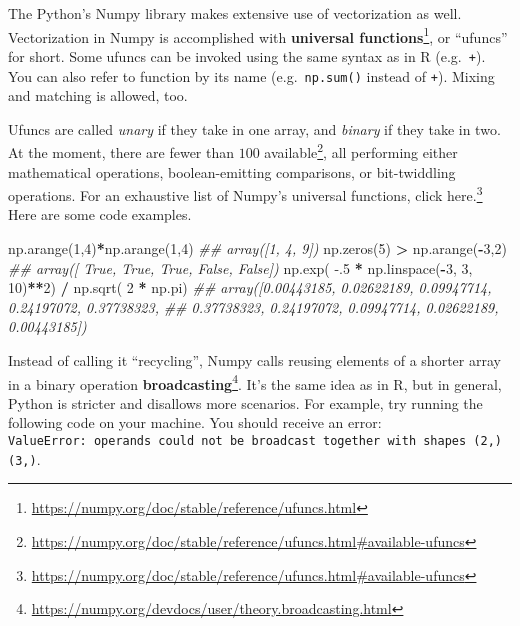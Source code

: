 \documentclass[12pt,krantz2]{krantz}
\makeatletter
\newenvironment{Shaded}{\begin{snugshade}}{\end{snugshade}}
\newcommand{\CommentTok}[1]{\textcolor[rgb]{0.37,0.37,0.37}{\textit{#1}}}
\newcommand{\DecValTok}[1]{\textcolor[rgb]{0.06,0.06,0.06}{#1}}
\newcommand{\FloatTok}[1]{\textcolor[rgb]{0.06,0.06,0.06}{#1}}
\newcommand{\NormalTok}[1]{#1}
\newcommand{\OperatorTok}[1]{\textcolor[rgb]{0.43,0.43,0.43}{\textbf{#1}}}
\renewcommand{\href}[2]{#2\footnote{\url{#1}}}
\newenvironment{kframe}{%
\medskip{}
\setlength{\fboxsep}{.8em}
 \def\at@end@of@kframe{}%
 \ifinner\ifhmode%
  \def\at@end@of@kframe{\end{minipage}}%
  \begin{minipage}{\columnwidth}%
 \fi\fi%
 \def\FrameCommand##1{\hskip\@totalleftmargin \hskip-\fboxsep
 \colorbox{shadecolor}{##1}\hskip-\fboxsep
     \hskip-\linewidth \hskip-\@totalleftmargin \hskip\columnwidth}%
 \MakeFramed {\advance\hsize-\width
   \@totalleftmargin\z@ \linewidth\hsize
   \@setminipage}}%
 {\par\unskip\endMakeFramed%
 \at@end@of@kframe}
\renewenvironment{Shaded}{\begin{kframe}}{\end{kframe}}
\makeatother
\begin{document}
The Python's Numpy library makes extensive use of vectorization as well. Vectorization in Numpy is accomplished with \href{https://numpy.org/doc/stable/reference/ufuncs.html}{\textbf{universal functions}}, or ``ufuncs'' for short. Some ufuncs can be invoked using the same syntax as in R (e.g.~\texttt{+}). You can also refer to function by its name (e.g.~\texttt{np.sum()} instead of \texttt{+}). Mixing and matching is allowed, too.

Ufuncs are called \emph{unary} if they take in one array, and \emph{binary} if they take in two. At the moment, there are \href{https://numpy.org/doc/stable/reference/ufuncs.html\#available-ufuncs}{fewer than \(100\) available}, all performing either mathematical operations, boolean-emitting comparisons, or bit-twiddling operations. For an exhaustive list of Numpy's universal functions, \href{https://numpy.org/doc/stable/reference/ufuncs.html\#available-ufuncs}{click here.} Here are some code examples.

\begin{Shaded}
\begin{Highlighting}[]
\NormalTok{np.arange(}\DecValTok{1}\NormalTok{,}\DecValTok{4}\NormalTok{)}\OperatorTok{*}\NormalTok{np.arange(}\DecValTok{1}\NormalTok{,}\DecValTok{4}\NormalTok{)}
\CommentTok{## array([1, 4, 9])}
\NormalTok{np.zeros(}\DecValTok{5}\NormalTok{) }\OperatorTok{>}\NormalTok{ np.arange(}\OperatorTok{-}\DecValTok{3}\NormalTok{,}\DecValTok{2}\NormalTok{)}
\CommentTok{## array([ True,  True,  True, False, False])}
\NormalTok{np.exp( }\FloatTok{-.5} \OperatorTok{*}\NormalTok{ np.linspace(}\OperatorTok{-}\DecValTok{3}\NormalTok{, }\DecValTok{3}\NormalTok{, }\DecValTok{10}\NormalTok{)}\OperatorTok{**}\DecValTok{2}\NormalTok{) }\OperatorTok{/}\NormalTok{ np.sqrt( }\DecValTok{2} \OperatorTok{*}\NormalTok{ np.pi)}
\CommentTok{## array([0.00443185, 0.02622189, 0.09947714, 0.24197072, 0.37738323,}
\CommentTok{##        0.37738323, 0.24197072, 0.09947714, 0.02622189, 0.00443185])}
\end{Highlighting}
\end{Shaded}

Instead of calling it ``recycling'', Numpy calls reusing elements of a shorter array in a binary operation \href{https://numpy.org/devdocs/user/theory.broadcasting.html}{\textbf{broadcasting}}. It's the same idea as in R, but in general, Python is stricter and disallows more scenarios. For example, try running the following code on your machine. You should receive an error: \texttt{ValueError:\ operands\ could\ not\ be\ broadcast\ together\ with\ shapes\ (2,)\ (3,)}.
\end{document}

